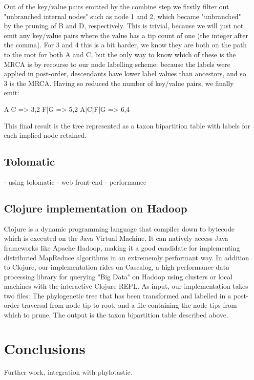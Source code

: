 \documentclass[10pt]{bmc_article}
\newenvironment{bmcformat}{\begin{raggedright}\baselineskip20pt\sloppy\setboolean{publ}{false}}{\end{raggedright}\baselineskip20pt\sloppy}
\begin{document}
\begin{bmcformat}
		Out of the key/value pairs emitted by the combine step we firstly filter 
		out "unbranched internal nodes" such as node 1 and 2, which became 
		"unbranched" by the pruning of B and D, respectively. This is trivial, 
		because we will just not emit any key/value pairs where the value has a
		tip count of one (the integer after the comma). For 3 and 4 this is a bit 
		harder, we know they are both on the path to the root for both A and C, but 
		the only way to know which of these is the MRCA is by recourse to our 
		node labelling scheme: because the labels were applied in post-order, 
		descendants have lower label values than ancestors, and so 3 is the MRCA. 
		Having so reduced the number of key/value pairs, we finally emit:

		 A|C     => 3,2
		 F|G     => 5,2
		 A|C|F|G => 6,4

		This final result is the tree represented as a taxon bipartition table 
		with labels for each implied node retained.

  \subsection*{Tolomatic}
  - using tolomatic
  - web front-end
  - performance

  \subsection*{Clojure implementation on Hadoop}

  Clojure is a dynamic programming language that compiles down to bytecode which is executed on the Java Virtual Machine. It can natively access Java frameworks like Apache Hadoop, making it a good candidate for implementing distributed MapReduce algorithms in an extrememly performant way. In addition to Clojure, our implementation rides on Cascalog, a high performance data processing library for querying "Big Data" on Hadoop using clusters or local machines with the interactive Clojure REPL. As input, our implementation takes two files: The phylogenetic tree that has been transformed and labelled in a post-order traversal from node tip to root, and a file containing the node tips from which to prune. The output is the  taxon bipartition table described above.

\section*{Conclusions}
  Further work, integration with phylotastic.
  

\end{bmcformat}
\end{document}
